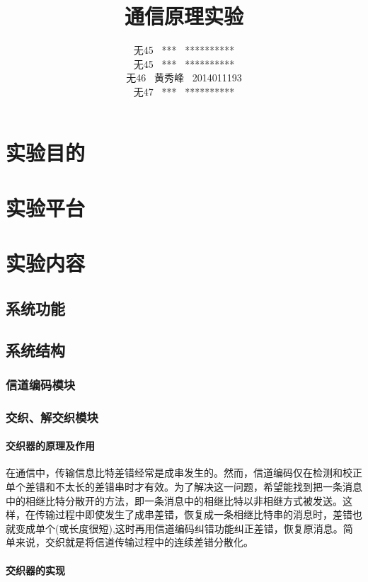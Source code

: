 \documentclass[UTF8]{ctexart}
\date{}
\title{\textbf{通信原理实验}}
\author{无45 \ *** \ **********\\
        无45 \ *** \ **********\\
        无46 \ 黄秀峰 \ 2014011193\\
        无47 \ *** \ **********}
\begin{document}
\maketitle

\section{实验目的}

\section{实验平台}

\section{实验内容}

\subsection{系统功能}

\subsection{系统结构}

\subsubsection{信道编码模块}


\subsubsection{交织、解交织模块}

\paragraph{交织器的原理及作用}

在通信中，传输信息比特差错经常是成串发生的。然而，信道编码仅在检测和校正单个差错和不太长的差错串时才有效。为了解决这一问题，希望能找到把一条消息中的相继比特分散开的方法，即一条消息中的相继比特以非相继方式被发送。这样，在传输过程中即使发生了成串差错，恢复成一条相继比特串的消息时，差错也就变成单个(或长度很短),这时再用信道编码纠错功能纠正差错，恢复原消息。简单来说，交织就是将信道传输过程中的连续差错分散化。

\paragraph{交织器的实现}
\end{document}

